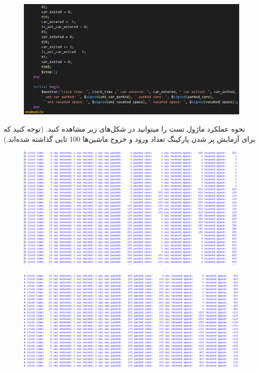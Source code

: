 \documentclass{article}
\begin{document}
\begin{enumerate}[label=\textbf{\alph*)}]
\begin{figure}[H]
    \centering
    \includegraphics[width=\textwidth]{Test3.png}
\end{figure}
نحوه عملکرد ماژول تست را میتوانید در شکل‌های زیر مشاهده کنید.
(توجه کنید که برای آزمایش پر شدن پارکینگ تعداد ورود و خروج ماشین‌ها 100 تایی
گذاشته شده‌اند.)

\begin{figure}[H]
    \centering
    \includegraphics[width=\textwidth]{Results1.png}
\end{figure}
\begin{figure}[H]
    \centering
    \includegraphics[width=\textwidth]{Results2.png}
\end{figure}


\end{enumerate}
\end{document}
